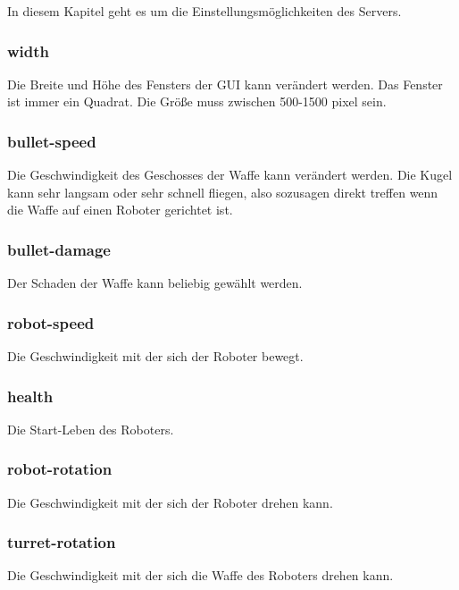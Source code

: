 \documentclass{article}
\begin{document}
In diesem Kapitel geht es um die Einstellungsmöglichkeiten des Servers.

\subsubsection{width}

Die Breite und Höhe des Fensters der GUI kann verändert werden. Das Fenster ist immer ein Quadrat. Die Größe muss zwischen 500-1500 pixel sein.

\subsubsection{bullet-speed}

Die Geschwindigkeit des Geschosses der Waffe kann verändert werden. Die Kugel kann sehr langsam oder sehr schnell fliegen, also sozusagen direkt treffen wenn die Waffe auf einen Roboter gerichtet ist.

\subsubsection{bullet-damage}

Der Schaden der Waffe kann beliebig gewählt werden.

\subsubsection{robot-speed}

Die Geschwindigkeit mit der sich der Roboter bewegt.

\subsubsection{health}

Die Start-Leben des Roboters.

\subsubsection{robot-rotation}

Die Geschwindigkeit mit der sich der Roboter drehen kann.

\subsubsection{turret-rotation}

Die Geschwindigkeit mit der sich die Waffe des Roboters drehen kann.
\end{document}
